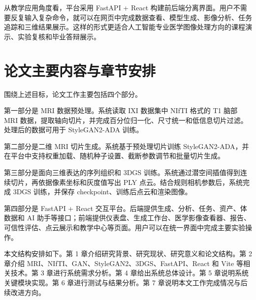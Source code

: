 从教学应用角度看，平台采用 FastAPI + React 构建前后端分离界面。用户不需要反复输入复杂命令，就可以在网页中完成数据查看、模型生成、影像分析、任务追踪和三维结果展示。这样的形式更适合人工智能专业医学图像处理方向的课程演示、实验复核和毕业答辩展示。

\section{论文主要内容与章节安排}
围绕上述目标，论文工作主要包括四个部分。

第一部分是 MRI 数据预处理。系统读取 IXI 数据集中 NIfTI 格式的 T1 脑部 MRI 数据，提取轴向切片，并完成百分位归一化、尺寸统一和低信息切片过滤。处理后的数据可用于 StyleGAN2-ADA 训练。

第二部分是二维 MRI 切片生成。系统基于预处理切片训练 StyleGAN2-ADA，并在平台中支持权重加载、随机种子设置、截断参数调节和批量切片生成。

第三部分是面向三维表达的序列组织和 3DGS 训练。系统通过潜空间插值得到连续切片，再依据像素坐标和灰度值写出 PLY 点云。结合规则相机参数后，系统完成 3DGS 训练，并保存 checkpoint、训练后点云和渲染图像。

第四部分是 FastAPI + React 交互平台。后端提供生成、分析、任务、资产、体数据和 AI 助手等接口；前端提供仪表盘、生成工作台、医学影像查看器、报告、可信性评估、点云展示和教学中心等页面。用户可以在统一界面中完成主要实验操作。

本文结构安排如下。第 1 章介绍研究背景、研究现状、研究意义和论文结构。第 2 章介绍 MRI、NIfTI、GAN、StyleGAN2、3DGS、FastAPI、React 和 Vite 等相关技术。第 3 章进行系统需求分析。第 4 章给出系统总体设计。第 5 章说明系统关键模块实现。第 6 章进行测试与结果分析。第 7 章说明本文工作完成情况与后续改进方向。

